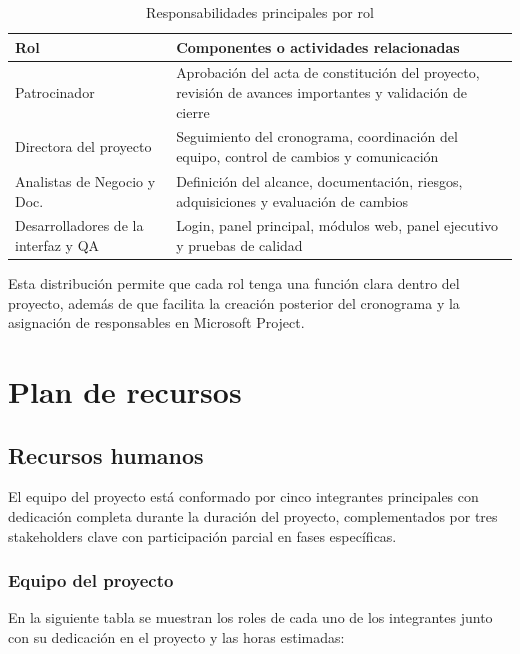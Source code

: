 \documentclass[11pt,spanish]{article}
\renewcommand{\arraystretch}{1.22}
\begin{document}
\begin{table}[H]
\centering
\small
\caption{Responsabilidades principales por rol}\label{tab:roles-entregables}
\setlength{\tabcolsep}{5pt}
\renewcommand{\arraystretch}{1.25}
\begin{tabularx}{\textwidth}{p{4.3cm} Y}
\toprule
\textbf{Rol} & \textbf{Componentes o actividades relacionadas} \\
\midrule
Patrocinador & Aprobación del acta de constitución del proyecto, revisión de avances importantes y validación de cierre \\
Directora del proyecto & Seguimiento del cronograma, coordinación del equipo, control de cambios y comunicación \\
Analistas de Negocio y Doc. & Definición del alcance, documentación, riesgos, adquisiciones y evaluación de cambios \\
Desarrolladores de la interfaz y QA & Login, panel principal, módulos web, panel ejecutivo y pruebas de calidad \\
\bottomrule
\end{tabularx}
\end{table}

Esta distribución permite que cada rol tenga una función clara dentro del proyecto, además de que facilita la creación posterior del cronograma y la asignación de responsables en Microsoft Project.

\newpage
\section{Plan de recursos}

\subsection{Recursos humanos}

El equipo del proyecto está conformado por cinco integrantes principales con dedicación completa durante la duración del proyecto, complementados por tres stakeholders clave con participación parcial en fases específicas.

\subsubsection{Equipo del proyecto}

En la siguiente tabla se muestran los roles de cada uno de los integrantes junto con su dedicación en el proyecto y las horas estimadas:
\end{document}
